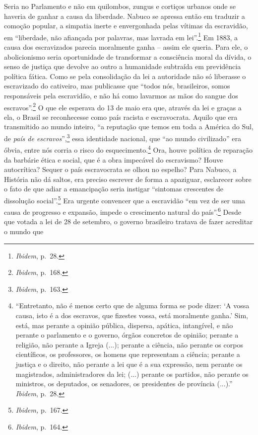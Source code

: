 Seria no Parlamento e não em quilombos, zungus e cortiços urbanos onde
se haveria de ganhar a causa da liberdade. Nabuco se apressa então em
traduzir a comoção popular, a simpatia inerte e envergonhada pelas
vítimas da escravidão, em ``liberdade, não afiançada por palavras, mas
lavrada em lei''.\footnote{\emph{Ibidem}, p.~28.} Em 1883, a causa dos
escravizados parecia moralmente ganha -- assim ele queria. Para ele, o
abolicionismo seria oportunidade de transformar a consciência moral da
dívida, o senso de justiça que devolve ao outro a humanidade subtraída
em previdência política fática. Como se pela consolidação da lei a
autoridade não só liberasse o escravizado do cativeiro, mas publicasse
que ``todos nós, brasileiros, somos responsáveis pela escravidão, e não
há como lavarmos as mãos do sangue dos escravos''.\footnote{\emph{Ibidem},
  p.~168.} O que ele esperava do 13 de maio era que, através da lei e
graças a ela, o Brasil se reconhecesse como país racista e escravocrata.
Aquilo que era transmitido ao mundo inteiro, ``a reputação que temos em
toda a América do Sul, de \emph{país de escravos}'',\footnote{\emph{Ibidem},
  p.~163.} essa identidade nacional, que ``ao mundo civilizado'' era
óbvia, entre nós corria o risco do esquecimento.\footnote{``Entretanto,
  não é menos certo que de alguma forma se pode dizer: `A vossa causa,
  isto é a dos escravos, que fizestes vossa, está moralmente ganha.'
  Sim, está, mas perante a opinião pública, dispersa, apática,
  intangível, e não perante o parlamento e o governo, órgãos concretos
  de opinião; perante a religião, não perante a Igreja (...); perante a
  ciência, não perante os corpos científicos, os professores, os homens
  que representam a ciência; perante a justiça e o direito, não perante
  a lei que é a sua expressão, nem perante os magistrados,
  administradores da lei; (...) perante os partidos, não perante os
  ministros, os deputados, os senadores, os presidentes de província
  (...).'' \emph{Ibidem}, p.~28.} Ora, houve política de reparação da
barbárie ética e social, que é a obra impecável do escravismo? Houve
autocrítica? Sequer o país escravocrata se olhou no espelho? Para
Nabuco, a História não dá saltos, era preciso escrever de forma a
apaziguar, esclarecer sobre o fato de que adiar a emancipação seria
instigar ``sintomas crescentes de dissolução social''.\footnote{\emph{Ibidem,}
  p.~167.} Era urgente convencer que a escravidão ``em vez de ser uma
causa de progresso e expansão, impede o crescimento natural do
país''.\footnote{\emph{Ibidem}, p.~164.} Desde que votada a lei de 28 de
setembro, o governo brasileiro tratava de fazer acreditar o mundo que
